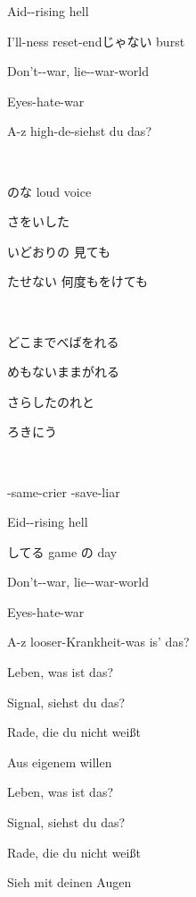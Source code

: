 Aid--rising hell

I'll-ness reset-endじゃない burst

Don't--war, lie--war-world

Eyes-hate-war

A-z  high-de-siehst du das?

~

のな  loud voice

さをいした

いどおりの 見ても

たせない 何度もをけても

~

どこまでべばをれる

めもないままがれる

さらしたのれと

ろきにう

~

-same-crier -save-liar

Eid--rising hell

してる game の day

Don't--war, lie--war-world

Eyes-hate-war

A-z looser-Krankheit-was is' das?

Leben, was ist das?

Signal, siehst du das?

Rade, die du nicht weißt

Aus eigenem willen

Leben, was ist das?

Signal, siehst du das?

Rade, die du nicht weißt

Sieh mit deinen Augen
